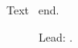 \documentclass{article}
\newif\ifshowfoo
\newenvironment{myenv}{\ifshowfoo\def\foo{FOO-INVENTED}\fi}{}
\begin{document}
\begin{myenv}Text \foo\ end.\end{myenv}
\begin{figure}\caption{Lead: \barx.}\end{figure}
\end{document}
